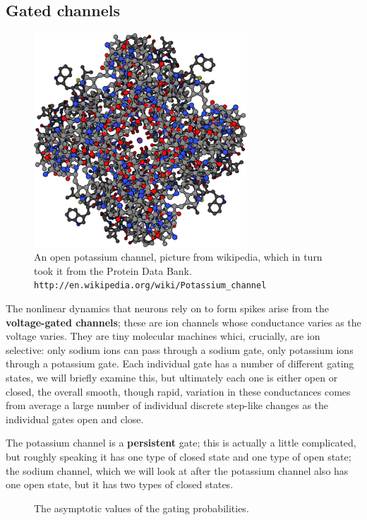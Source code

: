 \documentclass[11pt,a4paper]{scrartcl}
\begin{document}
\subsection*{Gated channels}

\begin{figure}
\begin{center}
\includegraphics[width=8cm]{potassium_channel.png}
\end{center}
\caption{An open potassium channel, picture from  wikipedia, which in turn took it from the Protein Data Bank. \texttt{http://en.wikipedia.org/wiki/Potassium\_channel}}
\end{figure}

The nonlinear dynamics that neurons rely on to form spikes arise from
the \textbf{voltage-gated channels}; these are ion channels whose
conductance varies as the voltage varies. They are tiny molecular
machines whici, crucially, are ion selective: only sodium ions can
pass through a sodium gate, only potassium ions through a potassium
gate. Each individual gate has a number of different gating states, we
will briefly examine this, but ultimately each one is either open or
closed, the overall smooth, though rapid, variation in these
conductances comes from average a large number of individual discrete
step-like changes as the individual gates open and close.

The potassium channel is a \textbf{persistent} gate; this is actually
a little complicated, but roughly speaking it has one type of closed
state and one type of open state; the sodium channel, which we will
look at after the potassium channel also has one open state, but it
has two types of closed states. 

\begin{figure}
\begin{center}

\end{center}
\caption{The asymptotic values of the gating probabilities.\label{fig:asymp_vals}}
\end{figure}
\end{document}
